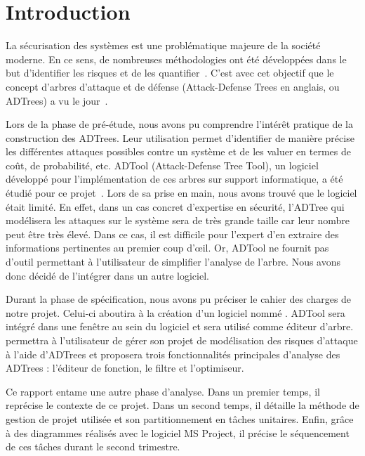 \section{Introduction}
    \label{sec:intro}

    La sécurisation des systèmes est une problématique majeure de la société moderne. En ce sens, de nombreuses méthodologies ont été développées dans le but d'identifier les risques et de les quantifier~\cite{survey}. C'est avec cet objectif que le concept d'arbres d'attaque et de défense (\og Attack-Defense Trees \fg{} en anglais, ou ADTrees) a vu le jour~\cite{JLC}.

    Lors de la phase de pré-étude, nous avons pu comprendre l’intérêt pratique de la construction des ADTrees. Leur utilisation permet d'identifier de manière précise les différentes attaques possibles contre un système et de les valuer en termes de coût, de probabilité, etc. ADTool (Attack-Defense Tree Tool), un logiciel développé pour l'implémentation de ces arbres sur support informatique, a été étudié pour ce projet~\cite{ADTool}. Lors de sa prise en main, nous avons trouvé que le logiciel était limité. En effet, dans un cas concret d'expertise en sécurité, l'ADTree qui modélisera les attaques sur le système sera de très grande taille car leur nombre peut être très élevé. Dans ce cas, il est difficile pour l'expert d'en extraire des informations pertinentes au premier coup d’œil. Or, ADTool ne fournit pas d'outil permettant à l'utilisateur de simplifier l'analyse de l'arbre. Nous avons donc décidé de l'intégrer dans un autre logiciel.

    Durant la phase de spécification, nous avons pu préciser le cahier des charges de notre projet. Celui-ci aboutira à la création d'un logiciel nommé \glasir{}. ADTool sera intégré dans une fenêtre au sein du logiciel et sera utilisé comme éditeur d'arbre. \glasir{} permettra à l'utilisateur de gérer son projet de modélisation des risques d'attaque à l'aide d'ADTrees et proposera trois fonctionnalités principales d'analyse des ADTrees : l'éditeur de fonction, le filtre et l'optimiseur.

    Ce rapport entame une autre phase d'analyse. Dans un premier temps, il reprécise le contexte de ce projet. Dans un second temps, il détaille la méthode de gestion de projet utilisée et son partitionnement en tâches unitaires. Enfin, grâce à des diagrammes réalisés avec le logiciel MS Project, il précise le séquencement de ces tâches durant le second trimestre.